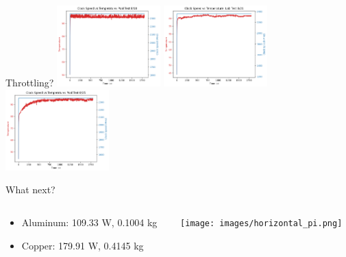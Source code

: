 \begin{frame}{Throttling?}
    \includegraphics[width=0.3\textwidth,keepaspectratio]{images/clock_speed_8-18.png}
    \includegraphics[width=0.3\textwidth,keepaspectratio]{images/clock_speed_8-21.png}
    \includegraphics[width=0.3\textwidth,keepaspectratio]{images/clock_speed_8-25.png}
\end{frame}

\begin{frame}{What next?}
    \begin{columns}
        \begin{column}{0.5\textwidth}
            \begin{itemize}
                \item Aluminum: 109.33 W, 0.1004 kg
                \item Copper: 179.91 W, 0.4145 kg
            \end{itemize}
        \end{column}
        \begin{column}{0.5\textwidth}
            \texttt{[image: images/horizontal\_pi.png]}
        \end{column}
    \end{columns}
\end{frame}
